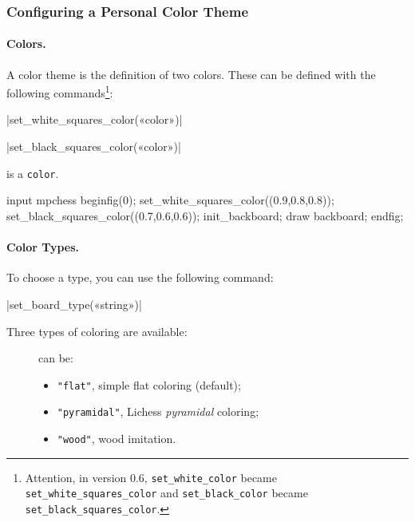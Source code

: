 \documentclass[english]{ltxdoc}
\begin{document}
\subsubsection{Configuring a Personal Color Theme}

\paragraph{Colors.}
A color theme is  the definition of two colors.
These can be defined with the following commands\footnote{Attention,
in version 0.6, \lstinline+set_white_color+ became
\lstinline+set_white_squares_color+ and \lstinline+set_black_color+ became
\lstinline+set_black_squares_color+.}:

\commande|set_white_squares_color(«color»)|\par
\commande|set_black_squares_color(«color»)|\smallskip

 is a \MP{} \lstinline+color+.

\begin{ExempleMP}
input mpchess
beginfig(0);
set_white_squares_color((0.9,0.8,0.8));
set_black_squares_color((0.7,0.6,0.6));
init_backboard;
draw backboard;
endfig;
\end{ExempleMP}

\paragraph{Color Types.}

To choose a type, you can use the following command:

\commande|set_board_type(«string»)|\smallskip


Three types of coloring are available:

\begin{description}
  \item[] can be:
\begin{itemize}
\item \lstinline+"flat"+,  simple flat coloring (default);
\item \lstinline+"pyramidal"+, Lichess \emph{pyramidal} coloring; 
\item \lstinline+"wood"+, wood imitation.
\end{itemize}
\end{description}
\end{document}
